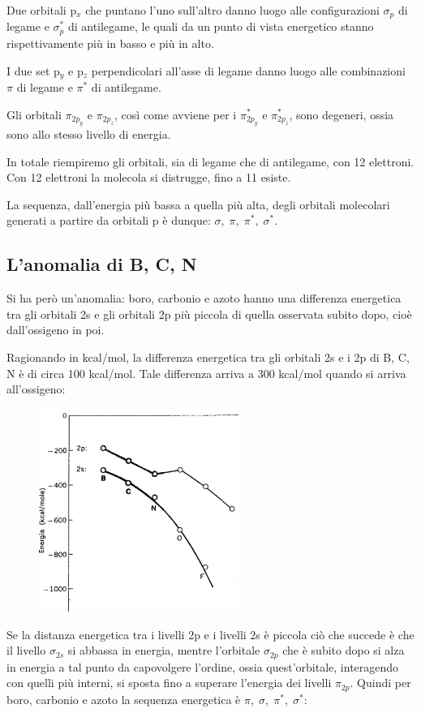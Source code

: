 \vspace{0.2cm}Due orbitali p$_x$ che puntano l'uno sull'altro danno luogo alle configurazioni $\sigma_p$ di legame e $\sigma^*_p$ di antilegame, le quali da un punto di vista energetico stanno rispettivamente più in basso e più in alto.

I due set p$_y$ e p$_z$ perpendicolari all'asse di legame danno luogo alle combinazioni $\pi$ di legame e $\pi^*$ di antilegame.

Gli orbitali $\pi_{2p_y}$ e $\pi_{2p_z}$, così come avviene per i $\pi_{2p_y}^*$ e $\pi_{2p_z}^*$, sono degeneri, ossia sono allo stesso livello di energia.

In totale riempiremo gli orbitali, sia di legame che di antilegame, con 12 elettroni. Con 12 elettroni la molecola si distrugge, fino a 11 esiste.

La sequenza, dall'energia più bassa a quella più alta, degli orbitali molecolari generati a partire da orbitali p è dunque: $\sigma, \; \pi, \; \pi^*, \; \sigma^*$.
\subsection{L'anomalia di B, C, N}
Si ha però un'anomalia: boro, carbonio e azoto hanno una differenza energetica tra gli orbitali 2s e gli orbitali 2p più piccola di quella osservata subito dopo, cioè dall'ossigeno in poi.

Ragionando in kcal/mol, la differenza energetica tra gli orbitali 2s e i 2p di B, C, N è di circa 100 kcal/mol. Tale differenza arriva a 300 kcal/mol quando si arriva all'ossigeno:
\newpage
\begin{figure}[htp]
    \centering
    \includegraphics[width=6.5cm]{immagini/differenza_energia_2s_2p.png}
\end{figure}

Se la distanza energetica tra i livelli 2p e i livelli 2s è piccola ciò che succede è che il livello $\sigma_{2s}$ si abbassa in energia, mentre l'orbitale $\sigma_{2p}$ che è subito dopo si alza in energia a tal punto da capovolgere l'ordine, ossia quest'orbitale, interagendo con quelli più interni, si sposta fino a superare l'energia dei livelli $\pi_{2p}$. Quindi per boro, carbonio e azoto la sequenza energetica è $\pi,\; \sigma, \; \pi^*, \; \sigma^*$:

